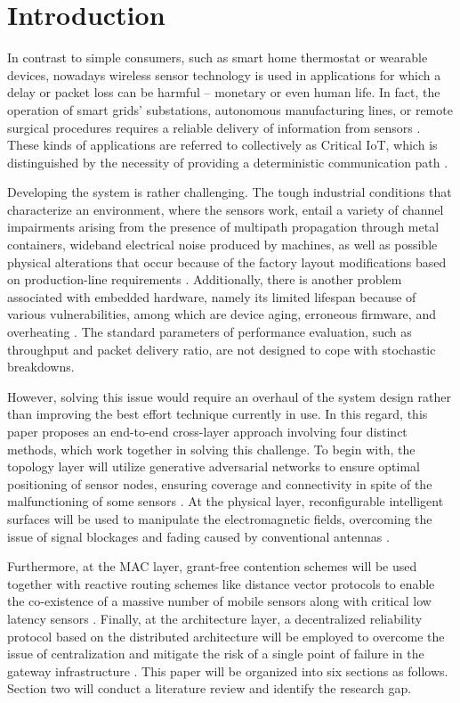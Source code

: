 \documentclass[a4paper,fleqn]{cas-dc}
\numberwithin{equation}{section}
\begin{document}
\section{Introduction}

In contrast to simple consumers, such as smart home thermostat or wearable devices, nowadays wireless sensor technology is used in applications for which a delay or packet loss can be harmful – monetary or even human life. In fact, the operation of smart grids' substations, autonomous manufacturing lines, or remote surgical procedures requires a reliable delivery of information from sensors \cite{Chen_2021_Survey}. These kinds of applications are referred to collectively as Critical IoT, which is distinguished by the necessity of providing a deterministic communication path \cite{b7}.

Developing the system is rather challenging. The tough industrial conditions that characterize an environment, where the sensors work, entail a variety of channel impairments arising from the presence of multipath propagation through metal containers, wideband electrical noise produced by machines, as well as possible physical alterations that occur because of the factory layout modifications based on production-line requirements \cite{b1, Nawaz_2024_Backscatter}. Additionally, there is another problem associated with embedded hardware, namely its limited lifespan because of various vulnerabilities, among which are device aging, erroneous firmware, and overheating \cite{b6}. The standard parameters of performance evaluation, such as throughput and packet delivery ratio, are not designed to cope with stochastic breakdowns.

However, solving this issue would require an overhaul of the system design rather than improving the best effort technique currently in use. In this regard, this paper proposes an end-to-end cross-layer approach involving four distinct methods, which work together in solving this challenge. To begin with, the topology layer will utilize generative adversarial networks to ensure optimal positioning of sensor nodes, ensuring coverage and connectivity in spite of the malfunctioning of some sensors \cite{b2}. At the physical layer, reconfigurable intelligent surfaces will be used to manipulate the electromagnetic fields, overcoming the issue of signal blockages and fading caused by conventional antennas \cite{b4}.

Furthermore, at the MAC layer, grant-free contention schemes will be used together with reactive routing schemes like distance vector protocols to enable the co-existence of a massive number of mobile sensors along with critical low latency sensors \cite{b5}. Finally, at the architecture layer, a decentralized reliability protocol based on the distributed architecture will be employed to overcome the issue of centralization and mitigate the risk of a single point of failure in the gateway infrastructure \cite{b3}. This paper will be organized into six sections as follows. Section two will conduct a literature review and identify the research gap.
\end{document}
